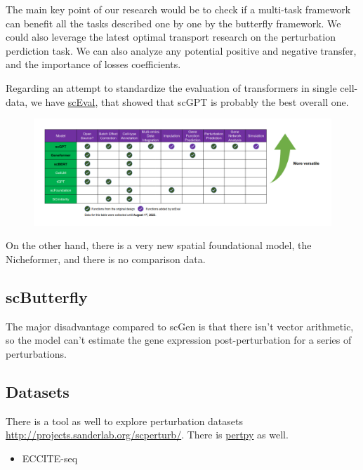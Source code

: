 \documentclass[12pt, a4paper]{article}
\begin{document}
The main key point of our research would be to check if a multi-task framework can benefit all the tasks described one by one by the butterfly framework. We could also leverage the latest optimal transport research on the perturbation perdiction task. We can also analyze any potential positive and negative transfer, and the importance of losses coefficients.

Regarding an attempt to standardize the evaluation of transformers in single cell-data, we have \href{https://github.com/HelloWorldLTY/scEval}{scEval}\cite{zhaoEvaluatingUtilitiesLarge2023}, that showed that scGPT is probably the best overall one.

\begin{figure}[h!]
  \centering
  \includegraphics[width=\textwidth]{sceval.png}
\end{figure}

On the other hand, there is a very new spatial foundational model, the Nicheformer, and there is no comparison data.

\subsection{scButterfly}

The major disadvantage compared to scGen is that there isn't vector arithmetic, so the model can't estimate the gene expression post-perturbation for a series of perturbations.

\subsection{Datasets}

There is a tool as well to explore perturbation datasets \url{http://projects.sanderlab.org/scperturb/}. There is \href{https://github.com/scverse/pertpy}{pertpy} as well.

\begin{itemize}
  \item ECCITE-seq
\end{itemize}
\end{document}
